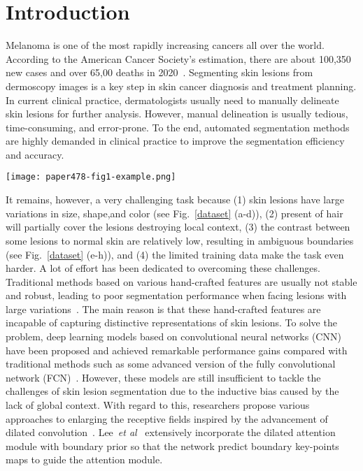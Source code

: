 \documentclass[runningheads]{paper478-llncs}
\begin{document}
\section{Introduction}
Melanoma is one of the most rapidly increasing cancers all over the world. 
According to the American Cancer Society’s estimation, there are about 100,350 new cases and over 65,00 deaths in 2020~\cite{mathur2020cancer}. 
Segmenting skin lesions from dermoscopy images is a key step in skin cancer diagnosis and treatment planning.
In current clinical practice, dermatologists usually need to manually delineate skin lesions for further analysis.  
However, manual delineation is usually tedious, time-consuming, and error-prone. 
To the end, automated segmentation methods are highly demanded in clinical practice to improve the segmentation efficiency and accuracy.
\begin{figure*}[t]
    \texttt{[image: paper478-fig1-example.png]}
    \caption{The challenges of automatic skin lesion segmentation from  dermoscopy images: (a)-(d) large skin lesion variations in size, shape, and color, (f)(g) partial occlusion by hair, and (f)-(h) ambiguous boundaries.
    }
    \label{dataset}
\end{figure*}
It remains, however, a very challenging task because (1) skin lesions have large variations in size, shape,and color (see Fig.~\ref{dataset} (a-d)), (2) present of hair will partially cover the lesions destroying local context, (3) the contrast between some lesions to normal skin are relatively low, resulting in ambiguous boundaries (see Fig.~\ref{dataset} (e-h)), and (4) the limited training data make the task even harder.
A lot of effort has been dedicated to overcoming these challenges.
Traditional methods based on various hand-crafted features are usually not stable and robust, leading to poor segmentation performance when facing lesions with large variations~\cite{5342426}. 
The main reason is that these hand-crafted features are incapable of capturing distinctive representations of skin lesions.
To solve the problem, deep learning models based on convolutional neural networks (CNN) have been proposed and achieved remarkable performance gains compared with traditional methods such as some advanced version of the fully convolutional network (FCN)~\cite{yuan2017automatic,7792699}.
However, these models are still insufficient to tackle the challenges of skin lesion segmentation due to the inductive bias caused by the lack of global context. 
With regard to this, researchers propose various approaches to enlarging the receptive fields inspired by the advancement of dilated convolution~\cite{yu2017dilated,yu2019multi}.
Lee~\textit{et al}~\cite{9157193} extensively incorporate the dilated attention module with boundary prior so that the network predict boundary key-points maps to guide the attention module.
\end{document}
